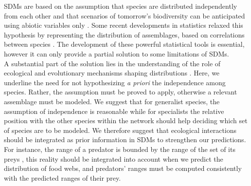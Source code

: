 SDMs are based on the assumption that species are distributed
independently from each other and that scenarios of tomorrow's
biodiversity can be anticipated using abiotic variables only
\citep{Jeschke2008}. Some recent developments in statistics relaxed this
hypothesis by representing the distribution of assemblages, based on
correlations between species \citep{Pollock2014, Warton2015b}. The
development of these powerful statistical tools is essential, however it
can only provide a partial solution to some limitations of SDMs.\\
A substantial part of the solution lies in the understanding of the role
of ecological and evolutionary mechanisms shaping distributions
\citep{Thuiller2013}. Here, we underline the need for not hypothesizing
\emph{a priori} the independence among species. Rather, the assumption
must be proved to apply, otherwise a relevant assemblage must be
modeled. We suggest that for generalist species, the assumption of
independence is reasonable while for specialists the relative position
with the other species within the network should help deciding which set
of species are to be modeled. We therefore suggest that ecological
interactions should be integrated as prior information in SDMs to
strengthen our predictions. For instance, the range of a predator is
bounded by the range of the set of its preys
\citep{Holt2009, Shenbrot2007}, this reality should be integrated into
account when we predict the distribution of food webs, and predators'
ranges must be computed consistently with the predicted ranges of their
prey.

